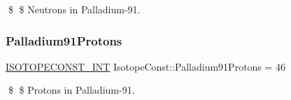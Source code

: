 \$ \$ Neutrons in Palladium-\/91. \mbox{\label{group___isotope_const-_palladium-_pd91_ga3aeded8968bb29988fb188e6aabce359}} 
\subsubsection{\texorpdfstring{Palladium91\+Protons}{Palladium91Protons}}
{\footnotesize\ttfamily \mbox{\hyperlink{group___isotope_const-_macros_ga5f18360b3e99483a35c32d789e62621c}{I\+S\+O\+T\+O\+P\+E\+C\+O\+N\+S\+T\+\_\+\+I\+NT}} Isotope\+Const\+::\+Palladium91\+Protons = 46}

\$ \$ Protons in Palladium-\/91. 